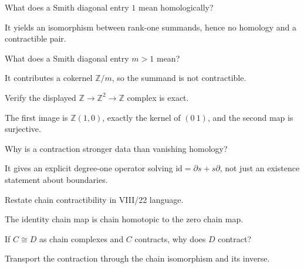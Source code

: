 \begin{problem}\label{prob:viii23-13}
What does a Smith diagonal entry \(1\) mean homologically?
\end{problem}
\begin{solution}
It yields an isomorphism between rank-one summands, hence no homology and a contractible pair.
\end{solution}

\begin{problem}\label{prob:viii23-14}
What does a Smith diagonal entry \(m>1\) mean?
\end{problem}
\begin{solution}
It contributes a cokernel \(\mathbb Z/m\), so the summand is not contractible.
\end{solution}

\begin{problem}\label{prob:viii23-15}
Verify the displayed \(\mathbb Z\to\mathbb Z^2\to\mathbb Z\) complex is exact.
\end{problem}
\begin{solution}
The first image is \(\mathbb Z(1,0)\), exactly the kernel of \((0\ 1)\), and the second map is surjective.
\end{solution}

\begin{problem}\label{prob:viii23-16}
Why is a contraction stronger data than vanishing homology?
\end{problem}
\begin{solution}
It gives an explicit degree-one operator solving \(\mathrm{id}=\partial s+s\partial\), not just an existence statement about boundaries.
\end{solution}

\begin{problem}\label{prob:viii23-17}
Restate chain contractibility in VIII/22 language.
\end{problem}
\begin{solution}
The identity chain map is chain homotopic to the zero chain map.
\end{solution}

\begin{problem}[Invariance]\label{prob:viii23-18}
If \(C\cong D\) as chain complexes and \(C\) contracts, why does \(D\) contract?
\end{problem}
\begin{solution}
Transport the contraction through the chain isomorphism and its inverse.
\end{solution}

